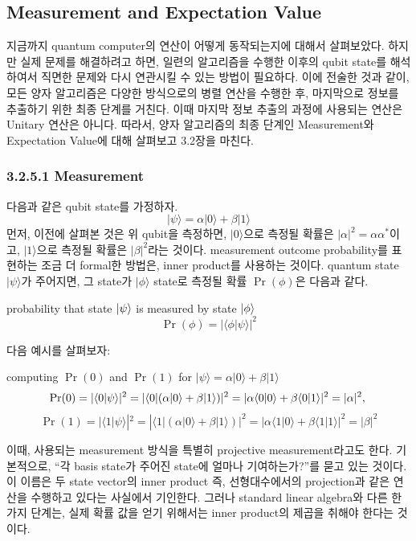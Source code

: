\subsection{Measurement and Expectation Value}
지금까지 quantum computer의 연산이 어떻게 동작되는지에 대해서 살펴보았다. 하지만 실제 문제를 해결하려고 하면, 일련의 알고리즘을 수행한 이후의 qubit state를 해석하여서 직면한 문제와 다시 연관시킬 수 있는 방법이 필요하다. 이에 전술한 것과 같이, 모든 양자 알고리즘은 다양한 방식으로의 병렬 연산을 수행한 후, 마지막으로 정보를 추출하기 위한 최종 단계를 거친다. 이때 마지막 정보 추출의 과정에 사용되는 연산은 Unitary 연산은 아니다. 따라서, 양자 알고리즘의 최종 단계인 Measurement와 Expectation Value에 대해 살펴보고 3.2장을 마친다.

\subsubsection{3.2.5.1 \quad Measurement}
다음과 같은 qubit state를 가정하자.
$$
|\psi \rangle = \alpha |0\rangle + \beta |1\rangle
$$
먼저, 이전에 살펴본 것은 위 qubit을 측정하면, $|0\rangle$으로 측정될 확률은 $|\alpha | ^2 = \alpha\alpha^*$이고, $|1\rangle$으로 측정될 확률은 $|\beta|^2$라는 것이다. measurement outcome probability를 표현하는 조금 더 formal한 방법은, inner product를 사용하는 것이다. quantum state $|\psi\rangle$가 주어지면, 그 state가 $|\phi \rangle$ state로 측정될 확률 \(\Pr(\phi)\)은 다음과 같다.%
\begin{definition}
    probability that state \(\ket\psi\) is measured by state \(\ket\phi\)
$$
\Pr(\phi) = |\langle \phi |\psi \rangle | ^2
$$
\end{definition}
다음 예시를 살펴보자:
\begin{example}
    computing $\Pr(0)$ and $\Pr(1)$ for $|\psi\rangle = \alpha|0\rangle + \beta|1\rangle$
\[
\Pr(0) = |\langle0|\psi\rangle|^2 =|\langle0|(\alpha|0\rangle +\beta|1\rangle)|^2 = |\alpha \langle0|0\rangle + \beta \langle0|1\rangle|^2 = |\alpha|^2, \\
\]
\[
\Pr(1) = |\langle1|\psi\rangle|^2 =|\langle1|(\alpha|0\rangle +\beta|1\rangle)|^2 = |\alpha \langle1|0\rangle + \beta \langle1|1\rangle|^2 = |\beta|^2
\]
\end{example}
이때, 사용되는 measurement 방식을 특별히 projective measurement라고도 한다. 기본적으로, “각 basis state가 주어진 state에 얼마나 기여하는가?”를 묻고 있는 것이다. 이 이름은 두 state vector의 inner product 즉, 선형대수에서의 projection과 같은 연산을 수행하고 있다는 사실에서 기인한다. 그러나 standard linear algebra와 다른 한 가지 단계는, 실제 확률 값을 얻기 위해서는 inner product의 제곱을 취해야 한다는 것이다.

